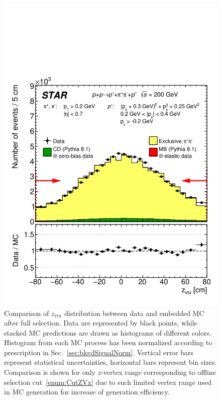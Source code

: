 \begin{figure}[ht!]
\centering%
\parbox{0.5725\textwidth}{%
  \centering%
  \includegraphics[width=\linewidth]{graphics/backgrounds/dataVsMc/Ratio_Linear_ZVtx.pdf} 
}%
\quad%
\parbox{0.3725\textwidth}{%
    \caption[Comparison of $z_{\text{vtx}}$ distribution between data and embedded MC.]{Comparison of $z_{\text{vtx}}$ distribution between data and embedded MC after full selection. Data are represented by black points, while stacked MC predictions are drawn as histograms of different colors. Histogram from each MC process has been normalized according to prescription in Sec.~\ref{sec:bkgdSignalNorm}. Vertical error bars represent statistical uncertainties, horizontal bars represent bin sizes. Comparison is shown for only $z$-vertex range corresponding to offline selection cut~\ref{enum:CutZVx} due to such limited vertex range used in MC generation for increase of generation efficiency.}\label{fig:Ratio_Linear_ZVtx} %
}
\end{figure}








